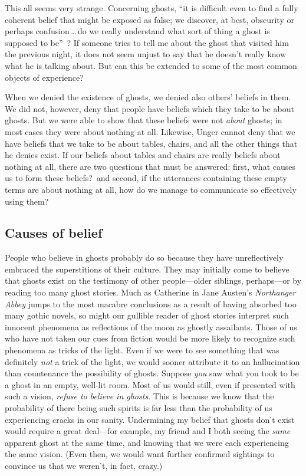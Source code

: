\documentclass[11pt]{article}
\begin{document}
\begin{spacing}{1.5}
This all seems very strange.  Concerning ghosts, ``it is difficult
even to find a fully coherent belief that might be exposed as false;
we discover, at best, obscurity or perhaps confusion\,\ldots\,do we
really understand what sort of thing a ghost is supposed to
be''~\citep[76]{stroud2000a}?  If someone tries to tell me about the
ghost that visited him the previous night, it does not seem unjust to
say that he doesn't really know what he is talking about.  But can
this be extended to some of the most common objects of experience?

When we denied the existence of ghosts, we denied also others' beliefs
in them.  We did not, however, deny that people have beliefs which
they take to be about ghosts.  But we were able to show that these
beliefs were not {\em about} ghosts; in most cases they were about
nothing at all.  Likewise, Unger cannot deny that we have beliefs that
we take to be about tables, chairs, and all the other things that he
denies exist.  If our beliefs about tables and chairs are really
beliefs about nothing at all, there are two questions that must be
answered: first, what causes us to form these beliefs?\ and second, if
the utterances containing these empty terms are about nothing at all,
how do we manage to communicate so effectively using them?

\subsection{Causes of belief}
\label{unger-cause}
People who believe in ghosts probably do so because they have
unreflectively embraced the superstitions of their culture.  They may
initially come to believe that ghosts exist on the testimony of other
people---older siblings, perhaps---or by reading too many ghost
stories.  Much as Catherine in Jane Austen's {\em Northanger Abbey}
jumps to the most macabre conclusions as a result of having absorbed
too many gothic novels, so might our gullible reader of ghost stories
interpret such innocent phenomena as reflections of the moon as
ghostly assailants.  Those of us who have not taken our cues from
fiction would be more likely to recognize such phenomena as tricks of
the light.  Even if we were to see something that was definitely {\em
  not} a trick of the light, we would sooner attribute it to an
hallucination than countenance the possibility of ghosts.  Suppose
{\em you} saw what you took to be a ghost in an empty, well-lit room.
Most of us would still, even if presented with such a vision, {\em
  refuse to believe in ghosts}.  This is because we know that the
probability of there being such spirits is far less than the
probability of us experiencing cracks in our sanity.  Undermining my
belief that ghosts don't exist would require a great deal---for
example, my friend and I both seeing the {\em same} apparent ghost at
the same time, and knowing that we were each experiencing the same
vision.  (Even then, we would want further confirmed sightings to
convince us that we weren't, in fact, crazy.)


\end{spacing}
\end{document}
